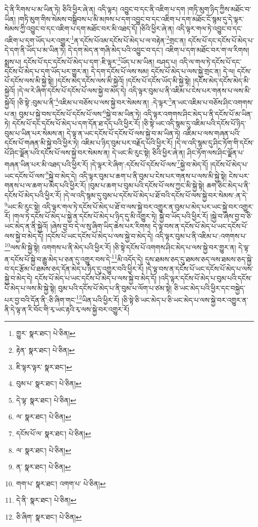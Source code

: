 དེ་ནི་རིགས་པ་མ་ཡིན་ཏེ། ཅིའི་ཕྱིར་ཞེ་ན། འདི་ལྟར། འབྱུང་བ་དང་ནི་འཇིག་པ་དག །གཏི་མུག་ཉིད་ཀྱིས་མཐོང་བ་ཡིན། །གཏི་མུག་གིས་སེམས་བསྒྲིབས་པ་མི་མཁས་པ་དག་འབྱུང་བ་དང་འཇིག་པ་དག་མཐོང་ངོ་སྙམ་དུ་དེ་ལྟར་སེམས་ཀྱི་འབྱུང་བ་དང་འཇིག་པ་དག་མཐོང་བར་མི་འཐད་དོ། །ཅིའི་ཕྱིར་ཞེ་ན། འདི་ལྟར་གལ་ཏེ་འབྱུང་བ་དང་འཇིག་པ་དག་ཡོད་པར་འགྱུར་\footnote{གྱུར་  སྣར་ཐང་།  པེ་ཅིན། }ན་དངོས་པོའམ་དངོས་པོ་མེད་པ་ལ་བརྟེན་\footnote{རྟེན་  སྣར་ཐང་།  པེ་ཅིན། }གྲང་ན། དངོས་པོ་དང་དངོས་པོ་མེད་པ་དེ་དག་ནི་ཡོད་པ་མ་ཡིན་ཏེ། དེ་དག་མེད་ན་གཞི་མེད་པའི་འབྱུང་བ་དང་། འཇིག་པ་དག་མཐོང་བར་ག་ལ་རིགས། སྨྲས་པ། དངོས་པོ་དང་དངོས་པོ་མེད་པ་དག་:ཇི་ལྟར་\footnote{ཇི་ལྟར་ལྟར་  སྣར་ཐང་། }ཡོད་པ་མ་ཡིན། བཤད་པ། འདི་ལ་གལ་ཏེ་དངོས་པོ་དང་དངོས་པོ་མེད་པ་དག་ཡོད་པར་གྱུར་ན། དེ་དག་དངོས་པོ་ལས་སམ། དངོས་པོ་མེད་པ་ལས་སྐྱེ་གྲང་ན། དེ་ལ། དངོས་པོ་དངོས་ལས་མི་སྐྱེ་སྟེ། །དངོས་མེད་དངོས་ལས་མི་སྐྱེའོ། །དངོས་པོ་དངོས་ཡོད་མི་སྐྱེ་སྟེ། །དངོས་མེད་དངོས་མེད་མི་སྐྱེའོ། །དེ་ལ་རེ་ཞིག་དངོས་པོ་དངོས་པོ་ལས་སྐྱེ་བ་མེད་དེ། འདི་ལྟར་བུམ་པ་ནི་འཇིམ་པ་ངེས་པར་གནས་པ་ལས་མི་སྐྱེའོ། །ཅི་སྟེ་:བུམ་པ་ནི་\footnote{བུམ་པ་  སྣར་ཐང་།  པེ་ཅིན། }འཇིམ་པ་བཅོས་པ་ལས་སྐྱེ་བར་སེམས་ན། :དེ་ལྟར་\footnote{དེ་ལྟ་  སྣར་ཐང་།  པེ་ཅིན། }ན་ཡང་འཇིམ་པ་བཅོས་ཤིང་འགགས་པ་ན། བུམ་པ་སྐྱེ་བས་དངོས་པོ་དངོས་པོ་ལས་\footnote{ལ་  སྣར་ཐང་།  པེ་ཅིན། }སྐྱེ་བ་མ་ཡིན་ཏེ། འདི་ལྟར་འགགས་ཤིང་མེད་པ་ནི་དངོས་པོ་མ་ཡིན་ཏེ། དངོས་པོ་དང་དངོས་པོ་མེད་པ་དག་དོན་ཐ་དད་པའི་ཕྱིར་རོ། །ཅི་སྟེ་ཡང་འདི་སྙམ་དུ་འཇིམ་པའི་དངོས་པོ་ཉིད་བུམ་པ་ཡིན་པར་སེམས་ན། དེ་ལྟ་ན་ཡང་དངོས་པོ་དངོས་པོ་ལས་སྐྱེ་བ་མ་ཡིན་ཏེ། འཇིམ་པ་ལས་གཞན་པའི་དངོས་པོ་གཞན་མི་སྐྱེ་བའི་ཕྱིར་ཏེ། འཇིམ་པ་ཉིད་བུམ་པར་བརྗོད་པའི་ཕྱིར་རོ། །དེ་ལ་འདི་སྙམ་དུ་ཤིང་ཏོག་གི་དངོས་པོ་ཤིང་ལྗོན་པའི་དངོས་པོ་ལས་སྐྱེ་བར་སེམས་ན། དེ་ཡང་མི་རུང་སྟེ། ཅིའི་ཕྱིར་ཞེ་ན། ཤིང་ཏོག་ལས་ཤིང་ལྗོན་པ་གཞན་ཡིན་པར་མི་འཐད་པའི་ཕྱིར་རོ། །དེ་ལྟར་རེ་ཞིག་:དངོས་པོ་དངོས་པོ་ལས་\footnote{དངོས་པོ་ལ་  སྣར་ཐང་།  པེ་ཅིན། }སྐྱེ་བ་མེད་དོ། །དངོས་པོ་མེད་པ་ཡང་དངོས་པོ་ལས་\footnote{ལ་  སྣར་ཐང་།  པེ་ཅིན། }སྐྱེ་བ་མེད་དེ། འདི་ལྟར་བུམ་པ་ཆག་པ་ནི་བུམ་པ་ངེས་པར་གནས་པ་ལས་མི་སྐྱེ་སྟེ། ངེས་པར་གནས་པ་ལ་ཆག་པ་མེད་པའི་ཕྱིར་རོ། །བུམ་པ་ཆག་པ་བུམ་པའི་དངོས་པོ་ལས་ཀྱང་མི་སྐྱེ་སྟེ། ཆག་ཅིང་མེད་པ་ནི་དངོས་པོ་མེད་པའི་ཕྱིར་རོ། །དེ་ལ་འདི་སྙམ་དུ་བུམ་པ་དངོས་པོ་མེད་པ་ཐོ་བའི་དངོས་པོ་ལས་སྐྱེ་བར་སེམས་:ན་དེ་\footnote{ན་  སྣར་ཐང་།  པེ་ཅིན། }ཡང་མི་རུང་སྟེ། འདི་ལྟར་གལ་ཏེ་དངོས་པོ་མེད་པ་ཐོ་བ་ལས་སྐྱེ་བར་འགྱུར་ན་བུམ་པ་མེད་པར་ཡང་སྐྱེ་བར་འགྱུར་རོ། །གལ་ཏེ་དངོས་པོ་མེད་པ་སྐྱེ་ན་དངོས་པོ་མེད་པ་ཉིད་དུ་མི་འགྱུར་ཏེ། སྐྱེ་བ་ཡོད་པའི་ཕྱིར་རོ། །སྐྱེ་བ་ཞེས་བྱ་བ་ཅི་ཡང་མེད་ན་ནི་སྐྱེའོ། །ཞེས་བྱ་བ་དེ་ལ་སུ་ཞིག་ཡིད་ཆེས་པར་རིགས། དེ་ལྟ་བས་ན་དངོས་པོ་མེད་པ་ཡང་དངོས་པོ་ལས་སྐྱེ་བ་མེད་དོ། །དངོས་པོ་ཡང་དངོས་པོ་མེད་པ་ལས་སྐྱེ་བ་མེད་དེ། འདི་ལྟར་བུམ་པ་ནི་འཇིམ་པ་:འགགས་པ་\footnote{གག་པ་  སྣར་ཐང་། འགག་པ་  པེ་ཅིན། }ལས་མི་སྐྱེ་སྟེ། འགགས་པ་ནི་མེད་པའི་ཕྱིར་རོ། །ཅི་སྟེ་དངོས་པོ་འགགས་ཤིང་མེད་པ་ལས་སྐྱེ་བར་གྱུར་ན། དེ་ལྟ་ན་དངོས་པོ་སྐྱེ་བ་རྒྱུ་མེད་པ་ཅན་དུ་འགྱུར་བས་དེ་\footnote{དེ་ནི་  སྣར་ཐང་།  པེ་ཅིན། }མི་འདོད་དེ། དུས་ཐམས་ཅད་དུ་ཐམས་ཅད་ལས་ཐམས་ཅད་སྐྱེ་བ་དང་རྩོམ་པ་ཐམས་ཅད་དོན་མེད་པ་ཉིད་དུ་འགྱུར་བའི་ཕྱིར་རོ། །དེ་ལྟ་བས་ན་དངོས་པོ་ཡང་དངོས་པོ་མེད་པ་ལས་སྐྱེ་བ་མེད་དེ། དངོས་པོ་མེད་པ་ཡང་དངོས་པོ་མེད་པ་ལས་སྐྱེ་བ་མེད་དོ། །འདི་ལྟར་དངོས་པོ་མེད་པ་བུམ་པའི་དངོས་པོ་མེད་པ་ལས་མི་སྐྱེ་སྟེ། བུམ་པའི་དངོས་པོ་མེད་པ་ནི་བུམ་པ་ལོག་པ་ཙམ་སྟེ། ཅི་ཡང་མེད་པའི་ཕྱིར་དང་བསྐྱེད་པར་བྱ་བའི་དོན་ནི་:ཅི་ཞིག་གང་\footnote{ཅི་ཞིག་  སྣར་ཐང་།  པེ་ཅིན། }ཡིན་པའི་ཕྱིར་རོ། །ཅི་སྟེ་ཅི་ཡང་མེད་པ་ཅི་ཡང་མེད་པ་ལས་སྐྱེ་བར་འགྱུར་ན་ནི་དེ་ལྟ་ན་རི་བོང་གི་རྭ་ཡང་རྟའི་རྭ་ལས་སྐྱེ་བར་འགྱུར་རོ། 